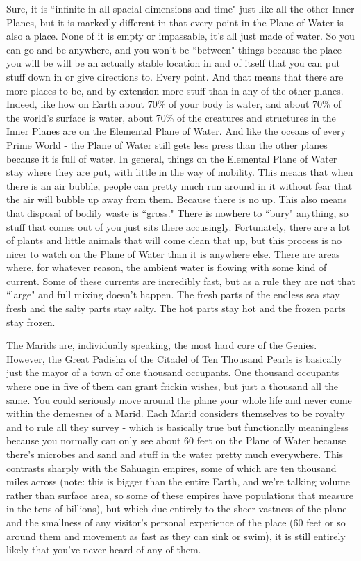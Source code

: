 Sure, it is ``infinite in all spacial dimensions and time" just like all the other Inner Planes, but it is markedly different in that every point in the Plane of Water is also a place. None of it is empty or impassable, it's all just made of water. So you can go and be anywhere, and you won't be ``between" things because the place you will be will be an actually stable location in and of itself that you can put stuff down in or give directions to. Every point. And that means that there are more places to be, and by extension more stuff than in any of the other planes. Indeed, like how on Earth about 70\% of your body is water, and about 70\% of the world's surface is water, about 70\% of the creatures and structures in the Inner Planes are on the Elemental Plane of Water. And like the oceans of every Prime World - the Plane of Water still gets less press than the other planes because it is full of water. In general, things on the Elemental Plane of Water stay where they are put, with little in the way of mobility. This means that when there is an air bubble, people can pretty much run around in it without fear that the air will bubble up away from them. Because there is no up. This also means that disposal of bodily waste is ``gross." There is nowhere to ``bury" anything, so stuff that comes out of you just sits there accusingly. Fortunately, there are a lot of plants and little animals that will come clean that up, but this process is no nicer to watch on the Plane of Water than it is anywhere else. There are areas where, for whatever reason, the ambient water is flowing with some kind of current. Some of these currents are incredibly fast, but as a rule they are not that ``large" and full mixing doesn't happen. The fresh parts of the endless sea stay fresh and the salty parts stay salty. The hot parts stay hot and the frozen parts stay frozen.

The Marids are, individually speaking, the most hard core of the Genies. However, the Great Padisha of the Citadel of Ten Thousand Pearls is basically just the mayor of a town of one thousand occupants. One thousand occupants where one in five of them can grant frickin wishes, but just a thousand all the same. You could seriously move around the plane your whole life and never come within the demesnes of a Marid. Each Marid considers themselves to be royalty and to rule all they survey - which is basically true but functionally meaningless because you normally can only see about 60 feet on the Plane of Water because there's microbes and sand and stuff in the water pretty much everywhere. This contrasts sharply with the Sahuagin empires, some of which are ten thousand miles across (note: this is bigger than the entire Earth, and we're talking volume rather than surface area, so some of these empires have populations that measure in the tens of billions), but which due entirely to the sheer vastness of the plane and the smallness of any visitor's personal experience of the place (60 feet or so around them and movement as fast as they can sink or swim), it is still entirely likely that you've never heard of any of them.

